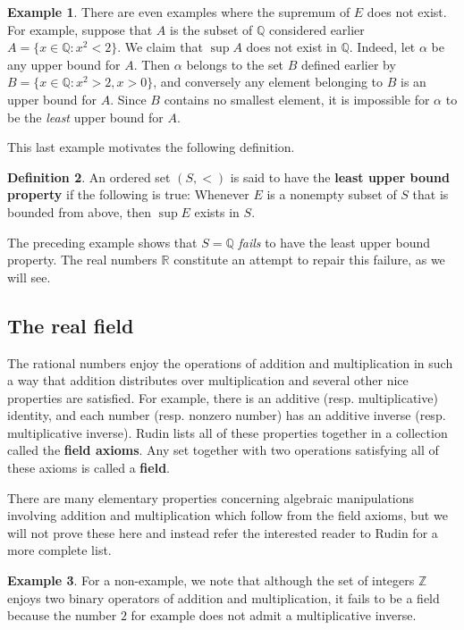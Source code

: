 \documentclass[12pt]{article}
\theoremstyle{definition}
\newtheorem{definition}{Definition}
\newtheorem{example}[definition]{Example}
\theoremstyle{theorem}
\begin{document}
\begin{example}
There are even examples where the supremum of $E$ does not exist. For example, suppose that $A$ is the subset of $\mathbb{Q}$ considered earlier $A = \{x \in \mathbb{Q} : x^2 < 2\}$. We claim that $\sup A$ does not exist in $\mathbb{Q}$. Indeed, let $\alpha$ be any upper bound for $A$. Then $\alpha$ belongs to the set $B$ defined earlier by $B = \{x \in \mathbb{Q} : x^2 > 2, x > 0\}$, and conversely any element belonging to $B$ is an upper bound for $A$. Since $B$ contains no smallest element, it is impossible for $\alpha$ to be the \emph{least} upper bound for $A$. 
\end{example}

This last example motivates the following definition. 

\begin{definition}
An ordered set $(S, <)$ is said to have the \textbf{least upper bound property} if the following is true: Whenever $E$ is a nonempty subset of $S$ that is bounded from above, then $\sup E$ exists in $S$. 
\end{definition}

The preceding example shows that $S = \mathbb{Q}$ \emph{fails} to have the least upper bound property.  The real numbers $\mathbb{R}$ constitute an attempt to repair this failure, as we will see. 

\subsection{The real field}

The rational numbers enjoy the operations of addition and multiplication in such a way that addition distributes over multiplication and several other nice properties are satisfied. For example, there is an additive (resp. multiplicative) identity, and each number (resp. nonzero number) has an additive inverse (resp. multiplicative inverse). Rudin lists all of these properties together in a collection called the \textbf{field axioms}. Any set together with two operations satisfying all of these axioms is called a \textbf{field}. 

There are many elementary properties concerning algebraic manipulations involving addition and multiplication which follow from the field axioms, but we will not prove these here and instead refer the interested reader to Rudin for a more complete list. 

\begin{example}
For a non-example, we note that although the set of integers $\mathbb{Z}$ enjoys two binary operators of addition and multiplication, it fails to be a field because the number $2$ for example does not admit a multiplicative inverse. 
\end{example}
\end{document}

